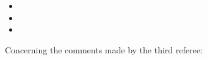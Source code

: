 \documentclass[11pt,a4paper,sans]{moderncv}        %
\begin{document}
\begin{itemize}
	\item 
	
	\item 
	
	\item 
	
	
	
\end{itemize}




Concerning the comments made by the third referee:
\end{document}
